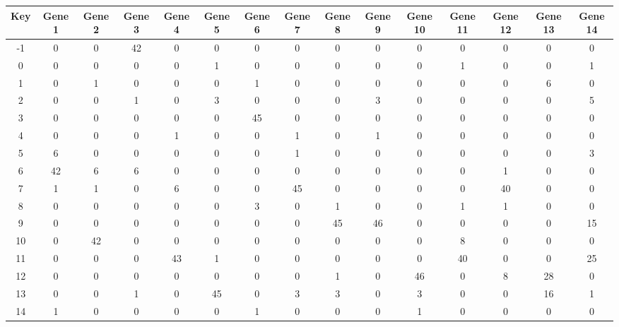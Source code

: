 \begin{tabular}{|c|c|c|c|c|c|c|c|c|c|c|c|c|c|c|}
\hline
Key & Gene 1 & Gene 2 & Gene 3 & Gene 4 & Gene 5 & Gene 6 & Gene 7 & Gene 8 & Gene 9 & Gene 10 & Gene 11 & Gene 12 & Gene 13 & Gene 14 \\
\hline
-1 & 0 & 0 & 42 & 0 & 0 & 0 & 0 & 0 & 0 & 0 & 0 & 0 & 0 & 0 \\
0 & 0 & 0 & 0 & 0 & 1 & 0 & 0 & 0 & 0 & 0 & 1 & 0 & 0 & 1 \\
1 & 0 & 1 & 0 & 0 & 0 & 1 & 0 & 0 & 0 & 0 & 0 & 0 & 6 & 0 \\
2 & 0 & 0 & 1 & 0 & 3 & 0 & 0 & 0 & 3 & 0 & 0 & 0 & 0 & 5 \\
3 & 0 & 0 & 0 & 0 & 0 & 45 & 0 & 0 & 0 & 0 & 0 & 0 & 0 & 0 \\
4 & 0 & 0 & 0 & 1 & 0 & 0 & 1 & 0 & 1 & 0 & 0 & 0 & 0 & 0 \\
5 & 6 & 0 & 0 & 0 & 0 & 0 & 1 & 0 & 0 & 0 & 0 & 0 & 0 & 3 \\
6 & 42 & 6 & 6 & 0 & 0 & 0 & 0 & 0 & 0 & 0 & 0 & 1 & 0 & 0 \\
7 & 1 & 1 & 0 & 6 & 0 & 0 & 45 & 0 & 0 & 0 & 0 & 40 & 0 & 0 \\
8 & 0 & 0 & 0 & 0 & 0 & 3 & 0 & 1 & 0 & 0 & 1 & 1 & 0 & 0 \\
9 & 0 & 0 & 0 & 0 & 0 & 0 & 0 & 45 & 46 & 0 & 0 & 0 & 0 & 15 \\
10 & 0 & 42 & 0 & 0 & 0 & 0 & 0 & 0 & 0 & 0 & 8 & 0 & 0 & 0 \\
11 & 0 & 0 & 0 & 43 & 1 & 0 & 0 & 0 & 0 & 0 & 40 & 0 & 0 & 25 \\
12 & 0 & 0 & 0 & 0 & 0 & 0 & 0 & 1 & 0 & 46 & 0 & 8 & 28 & 0 \\
13 & 0 & 0 & 1 & 0 & 45 & 0 & 3 & 3 & 0 & 3 & 0 & 0 & 16 & 1 \\
14 & 1 & 0 & 0 & 0 & 0 & 1 & 0 & 0 & 0 & 1 & 0 & 0 & 0 & 0 \\
\hline
\end{tabular}